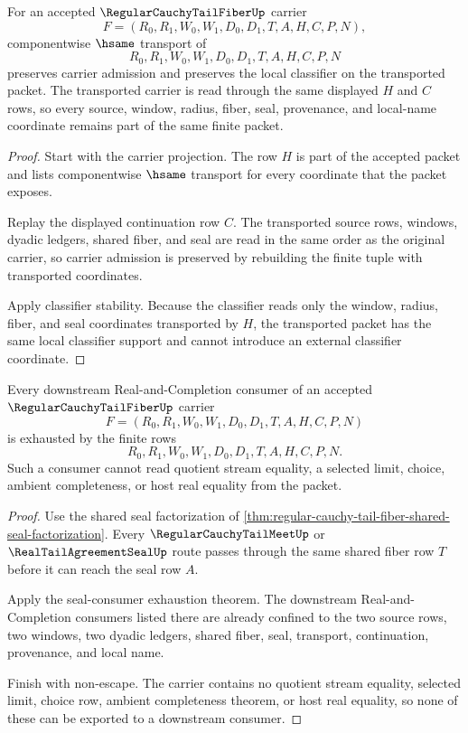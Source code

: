 \begin{theorem}
\label{thm:regular-cauchy-tail-fiber-componentwise-transport}
For an accepted $\RegularCauchyTailFiberUp$ carrier
$$
F=(R_0,R_1,W_0,W_1,D_0,D_1,T,A,H,C,P,N),
$$
componentwise $\hsame$ transport of
$$
R_0,R_1,W_0,W_1,D_0,D_1,T,A,H,C,P,N
$$
preserves carrier admission and preserves the local classifier on the transported packet. The transported carrier is read through the same displayed $H$ and $C$ rows, so every source, window, radius, fiber, seal, provenance, and local-name coordinate remains part of the same finite packet.
\end{theorem}
\begin{proof}
Start with the carrier projection. The row $H$ is part of the accepted packet and lists componentwise $\hsame$ transport for every coordinate that the packet exposes.

Replay the displayed continuation row $C$. The transported source rows, windows, dyadic ledgers, shared fiber, and seal are read in the same order as the original carrier, so carrier admission is preserved by rebuilding the finite tuple with transported coordinates.

Apply classifier stability. Because the classifier reads only the window, radius, fiber, and seal coordinates transported by $H$, the transported packet has the same local classifier support and cannot introduce an external classifier coordinate.
\end{proof}

\begin{theorem}
\label{thm:regular-cauchy-tail-fiber-ledger-exhaustion}
Every downstream Real-and-Completion consumer of an accepted $\RegularCauchyTailFiberUp$ carrier
$$
F=(R_0,R_1,W_0,W_1,D_0,D_1,T,A,H,C,P,N)
$$
is exhausted by the finite rows
$$
R_0,R_1,W_0,W_1,D_0,D_1,T,A,H,C,P,N.
$$
Such a consumer cannot read quotient stream equality, a selected limit, choice, ambient completeness, or host real equality from the packet.
\end{theorem}
\begin{proof}
Use the shared seal factorization of \autoref{thm:regular-cauchy-tail-fiber-shared-seal-factorization}. Every $\RegularCauchyTailMeetUp$ or $\RealTailAgreementSealUp$ route passes through the same shared fiber row $T$ before it can reach the seal row $A$.

Apply the seal-consumer exhaustion theorem. The downstream Real-and-Completion consumers listed there are already confined to the two source rows, two windows, two dyadic ledgers, shared fiber, seal, transport, continuation, provenance, and local name.

Finish with non-escape. The carrier contains no quotient stream equality, selected limit, choice row, ambient completeness theorem, or host real equality, so none of these can be exported to a downstream consumer.
\end{proof}

